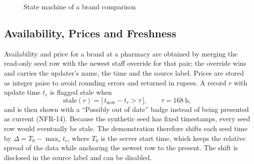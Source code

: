 \documentclass[11pt,a4paper]{article}
\begin{document}
\begin{figure}[H]
\centering
{}
\caption{State machine of a brand comparison}
\label{fig:states}
\end{figure}

\subsection{Availability, Prices and Freshness}\label{sec:fresh}
Availability and price for a brand at a pharmacy are obtained by merging the read-only seed row with the newest staff override for that pair; the override wins and carries the updater's name, the time and the source label. Prices are stored as integer paise to avoid rounding errors and returned in rupees. A record $r$ with update time $t_r$ is flagged stale when
\begin{equation}
\mathrm{stale}(r) = \big[\, t_{\mathrm{now}} - t_r > \tau \,\big], \qquad \tau = 168\ \mathrm{h},
\label{eq:stale}
\end{equation}
and is then shown with a ``Possibly out of date'' badge instead of being presented as current (NFR-14). Because the synthetic seed has fixed timestamps, every seed row would eventually be stale. The demonstration therefore shifts each seed time by $\Delta = T_0 - \max_r t_r$, where $T_0$ is the server start time, which keeps the relative spread of the data while anchoring the newest row to the present. The shift is disclosed in the source label and can be disabled.
\end{document}
